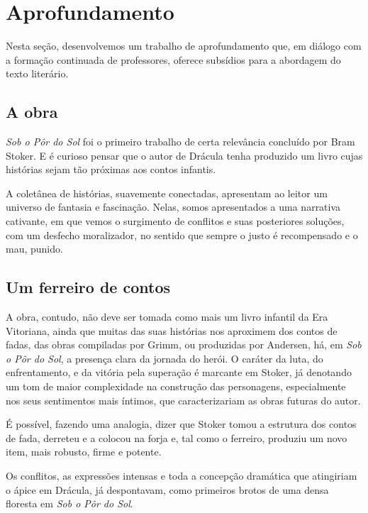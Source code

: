 \documentclass[12pt]{extarticle}
\begin{document}
\section{Aprofundamento}

Nesta seção, desenvolvemos um trabalho de aprofundamento que, em diálogo
com a formação continuada de professores, oferece subsídios para a
abordagem do texto literário.

\subsection{A obra}

\emph{Sob o Pôr do Sol} foi o primeiro trabalho de certa relevância
concluído por Bram Stoker. E é curioso pensar que o autor de Drácula
tenha produzido um livro cujas histórias sejam tão próximas aos contos
infantis.


A coletânea de histórias, suavemente conectadas, apresentam ao leitor um
universo de fantasia e fascinação. Nelas, somos apresentados a uma
narrativa cativante, em que vemos o surgimento de conflitos e suas
posteriores soluções, com um desfecho moralizador, no sentido que sempre
o justo é recompensado e o mau, punido.

\subsection{Um ferreiro de contos}

A obra, contudo, não deve ser tomada como mais um livro infantil da Era
Vitoriana, ainda que muitas das suas histórias nos aproximem dos contos
de fadas, das obras compiladas por Grimm, ou produzidas por Andersen,
há, em \emph{Sob o Pôr do Sol}, a presença clara da jornada do herói. O
caráter da luta, do enfrentamento, e da vitória pela superação é
marcante em Stoker, já denotando um tom de maior complexidade na
construção das personagens, especialmente nos seus sentimentos mais
íntimos, que caracterizariam as obras futuras do autor.

É possível, fazendo uma analogia, dizer que Stoker tomou a estrutura dos
contos de fada, derreteu e a colocou na forja e, tal como o ferreiro,
produziu um novo item, mais robusto, firme e potente.

Os conflitos, as expressões intensas e toda a concepção dramática que
atingiriam o ápice em Drácula, já despontavam, como primeiros brotos de
uma densa floresta em \emph{Sob o Pôr do Sol}.
\end{document}
